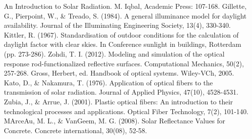 \documentclass[times, 10pt,a4paper]{article}
\begin{document}
\begin{thebibliography}{4}
An Introduction to Solar Radiation. M. Iqbal, Academic Press: 107-168.
 Gillette, G., Pierpoint, W., \& Treado, S. (1984). A general illuminance model for daylight availability.
 Journal of the Illuminating Engineering Society, 13(4), 330-340.
 Kittler, R. (1967). Standardisation of outdoor conditions for the calculation of daylight factor with 
clear skies. In Conference sunlight in buildings, Rotterdam (pp. 273-286).
 Zohdi, T. I. (2012). Modeling and simulation of the optical response rod-functionalized reflective
 surfaces. Computational Mechanics, 50(2), 257-268.
 Gross, Herbert, ed. Handbook of optical systems. Wiley-VCh, 2005.
 Kato, D., \& Nakamura, T. (1976). Application of optical fibers to the transmission of solar radiation. 
Journal of Applied Physics, 47(10), 4528-4531.
 Zubia, J., \& Arrue, J. (2001). Plastic optical fibers: An introduction to their technological processes
 and applications. Optical Fiber Technology, 7(2), 101-140.
 MArceAu, M. L., \& VanGeem, M. G. (2008). Solar Reflectance Values for Concrete. Concrete 
international, 30(08), 52-58.

\end{thebibliography}
\end{document}
